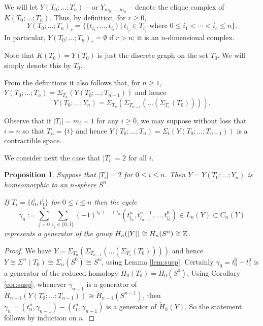 \documentclass[12pt]{amsart}
\newtheorem{prop}[lem]{Proposition}
\theoremstyle{definition}
\newcommand{\Z}{\Bbb{Z}}
\newcommand{\<}{\langle}
\renewcommand{\>}{\rangle}
\newcommand{\mc}[2]{\Sigma_{#1}(#2)}
\begin{document}
We will let $Y(T_0;\ldots;T_n)$ -- or $Y_{m_0,\ldots,m_n}$ --  denote the clique complex of $K(T_0;\ldots;T_n)$. Thus, by definition, for $r\geq 0$, 
\[
Y(T_0;\ldots;T_n)_r=\{ \{ t_{i_1},\ldots,t_{i_r}\}\ |\ t_{i_j}\in T_{i_j}\mbox{ where }0\leq i_1<\cdots <i_r\leq n\}.
\]
In particular, $Y(T_0;\ldots;T_n)_r=\emptyset$ if $r>n$; it is an $n$-dimensional complex.

Note that $K(T_0)=Y(T_0)$ is just the discrete graph on the set $T_0$.  We will simply denote this by $T_0$.

From the definitions it also follows that, for $n\geq 1$,  $Y(T_0;\ldots;T_n)=\mc{T_n}{Y(T_0;\ldots;T_{n-1})}$ and hence
\[
Y(T_0;\ldots;Y_n)=\mc{T_n}{\mc{T_{n-1}}{\ldots (\mc{T_1}{T_0}})}.
\]

Observe that if $|T_i|=m_i=1$ for any $i\geq 0$, we may suppose without loss that $i=n$ so that $T_n=\{ t\}$ and hence $Y(T_0;\ldots;T_n)=\mc{t}{Y(T_0;\ldots;T_{n-1})}$ is a contractible 
space. 

We consider next the case that $|T_i|=2$ for all $i$.

\begin{prop}\label{prop:mc2}  Suppose that $|T_i|=2$ for $0\leq i\leq n$. Then $Y=Y(T_0;\ldots;Y_n)$ is homeomorphic to an $n$-sphere $S^n$.

 If $T_i=\{ t^i_0,t^i_1\}$ for 
$0\leq i\leq n$ then the cycle \[
\gamma_n:=\sum_{j=0}^n\sum_{i_j\in \{ 0,1\}}(-1)^{i_0+\cdots+i_n}(t^n_{i_n},t^{n-1}_{i_{n-1}},\ldots,t^0_{i_0})\in L_n(Y)\subset C_n(Y)
\]
 represents a generator of the  group $H_n(|Y|)\cong H_n(S^n)\cong \Z$.
\end{prop}

\begin{proof} We have $Y= \mc{T_n}{\mc{T_{n-1}}{\ldots (\mc{T_1}{T_0}})}$ and hence $Y\cong \Sigma^n(T_0)\cong \Sigma_n(S^0)\cong S^n$, using Lemma \ref{lem:susp}.
Certainly $\gamma_0=t^0_0-t^0_1$ is a generator of the reduced homology $\tilde{H}_0(T_0)=\tilde{H}_0(S^0)$. Using Corollary \ref{cor:susp}, whenever $\gamma_{n-1}$ is a generator of $\tilde{H}_{n-1}(Y(T_0;\ldots;T_{n-1}))\cong \tilde{H}_{n-1}(S^{n-1})$, then $\gamma_n=(t^n_0,\gamma_{n-1})-(t^n_1,\gamma_{n-1})$ is a generator of $\tilde{H}_n(Y)$. So the statement follows by induction on $n$.
\end{proof}
\end{document}
